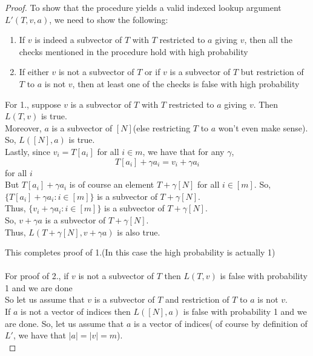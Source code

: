 \begin{proof}
    To show that the procedure yields a valid indexed lookup argument $L'(T, v, a)$, we need to show the following:
    \begin{enumerate}

        \item If $v$ is indeed a subvector of $T$ with $T$ restricted to $a$ giving $v$, then all the checks mentioned in the procedure hold with high probability
        \item If either $v$ is not a subvector of $T$ or if $v$ is a subvector of $T$ but restriction of $T$ to $a$ is not $v$, then at least one of the checks is false with high probability
    \end{enumerate}

    For 1., suppose $v$ is a subvector of $T$ with $T$ restricted to $a$ giving $v$. Then $L(T, v)$ is true. \\
    Moreover, $a$ is a subvector of $[N]$(else restricting $T$ to $a$ won't even make sense). \\
    So, $L([N], a)$ is true. \\
    Lastly, since $v_i=T[a_i]$ for all $i \in m$, we have that for any $\gamma$,
    $$T[a_i]+\gamma a_i=v_i+\gamma a_i$$ for all $i$ \\
    But $T[a_i]+\gamma a_i$ is of course an element $T+\gamma [N] $ for all $i \in [m]$. So, $\{T[a_i]+\gamma a_i:i \in [m]\}$ is a subvector of $T+\gamma [N] $.\\
    Thus, $\{v_i+\gamma a_i:i \in [m]\}$ is a subvector of $T+\gamma [N] $.\\
    So, $v+\gamma a$ is a subvector of $T+\gamma [N] $.\\
    Thus, $L(T+\gamma[N], v+\gamma a)$ is also true.

    This completes proof of 1.(In this case the high probability is actually 1) \\\\
    For proof of 2., if $v$ is not a subvector of $T$ then $L(T, v)$ is false with probability 1 and we are done \\
    So let us assume that $v$ is a subvector of $T$ and restriction of $T$ to $a$ is not $v$.\\
    If $a$ is not a vector of indices then $L([N], a)$ is false with probability 1 and we are done. So, let us assume that $a$ is a vector of indices( of course by definition of $L'$, we have that $|a|=|v|=m$).\\


\end{proof}

